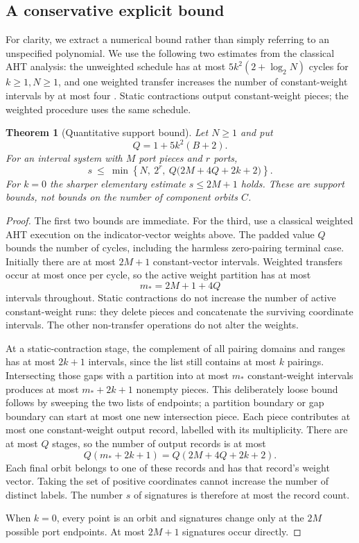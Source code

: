 \documentclass[11pt,letterpaper]{article}
\newtheorem{theorem}{Theorem}[section]
\theoremstyle{definition}
\begin{document}
\subsection{A conservative explicit bound}
For clarity, we extract a numerical bound rather than simply referring to an
unspecified polynomial. We use the following two estimates from the
classical AHT analysis: the unweighted schedule has at most
$5k^2(2+\log_2N)$ cycles for $k\ge1,N\ge1$, and one weighted transfer
increases the number of constant-weight intervals by at most four
\cite[proof of Theorem~12 and Lemma~15]{aht}. Static contractions output
constant-weight pieces; the weighted procedure uses the same schedule.

\begin{theorem}[Quantitative support bound]\label{thm:support}
Let $N\ge1$ and put
\[
 Q=1+5k^2(B+2).
\]
For an interval system with $M$ port pieces and $r$ ports,
\begin{equation}\label{eq:support-bound}
 s\ \le\ \min\!\left\{N,\ 2^r,\
 Q\bigl(2M+4Q+2k+2\bigr)\right\}.
\end{equation}
For $k=0$ the sharper elementary estimate $s\le2M+1$ holds.
These are support bounds, not bounds on the number of component orbits $C$.
\end{theorem}
\begin{proof}
The first two bounds are immediate. For the third, use a classical weighted
AHT execution on the indicator-vector weights above. The padded value $Q$
bounds the number of cycles, including the harmless zero-pairing terminal
case. Initially there are at most $2M+1$ constant-vector intervals. Weighted
transfers occur at most once per cycle, so the active weight partition has
at most
\[
 m_* = 2M+1+4Q
\]
intervals throughout. Static contractions do not increase the number of
active constant-weight runs: they delete pieces and concatenate the
surviving coordinate intervals. The other non-transfer operations do not
alter the weights.

At a static-contraction stage, the complement of all pairing domains and
ranges has at most $2k+1$ intervals, since the list still contains at most
$k$ pairings. Intersecting those gaps with a partition into at most $m_*$
constant-weight intervals produces at most $m_*+2k+1$ nonempty pieces.
This deliberately loose bound follows by sweeping the two lists of
endpoints; a partition boundary or gap boundary can start at most one new
intersection piece. Each piece contributes at most one constant-weight
output record, labelled with its multiplicity. There are at most $Q$
stages, so the number of output records is at most
\[
 Q(m_*+2k+1)=Q(2M+4Q+2k+2).
\]
Each final orbit belongs to one of these records and has that record's
weight vector. Taking the set of positive coordinates cannot increase the
number of distinct labels. The number $s$ of signatures is therefore at
most the record count.

When $k=0$, every point is an orbit and signatures change only at the
$2M$ possible port endpoints. At most $2M+1$ signatures occur directly.
\end{proof}
\end{document}

